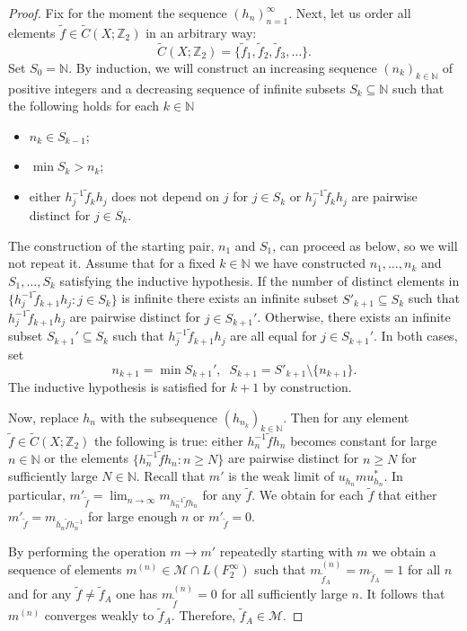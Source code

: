 \documentclass[11pt]{amsart}
\newcommand{\N}{\mathbb N}
\theoremstyle{plain}
\theoremstyle{definition}
\theoremstyle{remark}
\numberwithin{equation}{section}
\begin{document}
\begin{proof}
Fix for the moment the sequence $(h_n)_{n=1}^\infty$. Next, let us order all elements $\widetilde f\in \widetilde C(X;\mathbb{Z}_2)$ in an arbitrary way: $$\widetilde C(X;\mathbb{Z}_2)=\{\widetilde f_1,\widetilde f_2,\widetilde f_3,\ldots\}.$$ Set $S_0 = \mathbb{N}$. By induction, we will construct an increasing sequence $(n_k)_{k \in \N}$ of positive integers and a decreasing sequence of infinite subsets $S_k\subseteq\mathbb N$ such that the following holds for each $k\in \N$ 
	\begin{itemize}
		\item[$1)$] $n_k\in S_{k-1}$;
		\item[$2)$] $\min S_k>n_k$;
		\item[$3)$] either $h_j^{-1}\widetilde f_kh_j$ does not depend on $j$ for $j\in S_k$ or $h_j^{-1}\widetilde f_k h_j$ are pairwise distinct for $j\in S_k$.
	\end{itemize} 
The construction of the starting pair, $n_1$ and $S_1$, can proceed as below, so we will not repeat it. Assume that for a fixed $k \in \N$ we have constructed $n_1,\ldots,n_k$ and $S_1,\ldots, S_k$ satisfying the inductive hypothesis. If the number of distinct elements in $\{h_j^{-1} \widetilde f_{k+1} h_j:j\in S_k\}$ is infinite there exists an infinite subset $S'_{k+1}\subseteq S_k$ such that $h_j^{-1}\widetilde f_{k+1} h_j$ are pairwise distinct for $j\in S_{k+1}'$. Otherwise, there exists an infinite subset $S_{k+1}'\subseteq S_k$ such that $h_j^{-1}\widetilde f_{k+1} h_j$ are all equal for $j\in S_{k+1}'$. In both cases, set $$n_{k+1}=\min S_{k+1}',\;\;S_{k+1}=S'_{k+1}\setminus \{n_{k+1}\}.$$  The inductive hypothesis is satisfied for $k+1$ by construction.
	
	
Now, replace $h_n$ with the  subsequence $(h_{n_k})_{k \in \N}$. Then for any element $\widetilde f\in\widetilde C(X;\mathbb{Z}_2)$ the following is true: either  $h_n^{-1}\widetilde f h_n$ becomes constant for large $n\in \N$ or  the elements $\{h_n^{-1}\widetilde f h_n:n\geqslant N\}$ are pairwise distinct for $n\geqslant N$ for sufficiently large $N\in \N$. Recall that $m'$ is the weak limit of $u_{h_n}mu_{h_n}^*$. In particular, $m'_{\widetilde f}=\lim_{n \to \infty} m_{h_n^{-1}\widetilde fh_n}$ for any $\widetilde f$. We obtain for each $\widetilde f$ that either  $m'_{\widetilde f}=m_{h_n\widetilde f h_n^{-1}}$ for large enough $n$ or $m'_{\widetilde f}=0$. 
	
By performing the operation $m\to m'$ repeatedly starting with $m$ we obtain a sequence of elements $m^{(n)}\in \mathcal M\cap L(F_2^\infty)$ such that $m^{(n)}_{\widetilde f_A}=m_{\widetilde f_A}=1$ for all $n$ and for any $\widetilde f\neq \widetilde f_A$ one has $m^{(n)}_{\widetilde f}=0$ for all sufficiently large $n$. It follows that $m^{(n)}$ converges weakly to $\widetilde f_A$. Therefore, $\widetilde f_A\in \mathcal M$. 



\end{proof}
\end{document}
